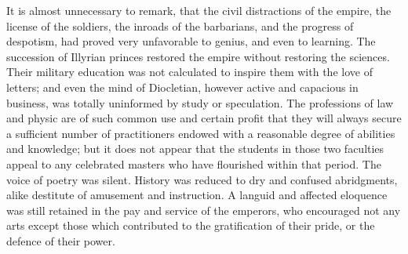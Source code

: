 It is almost unnecessary to remark, that the civil distractions
of the empire, the license of the soldiers, the inroads of the
barbarians, and the progress of despotism, had proved very
unfavorable to genius, and even to learning. The succession of
Illyrian princes restored the empire without restoring the
sciences. Their military education was not calculated to inspire
them with the love of letters; and even the mind of Diocletian,
however active and capacious in business, was totally uninformed
by study or speculation. The professions of law and physic are of
such common use and certain profit that they will always secure a
sufficient number of practitioners endowed with a reasonable
degree of abilities and knowledge; but it does not appear that
the students in those two faculties appeal to any celebrated
masters who have flourished within that period. The voice of
poetry was silent. History was reduced to dry and confused
abridgments, alike destitute of amusement and instruction. A
languid and affected eloquence was still retained in the pay and
service of the emperors, who encouraged not any arts except those
which contributed to the gratification of their pride, or the
defence of their power.\footnotemark[123]


